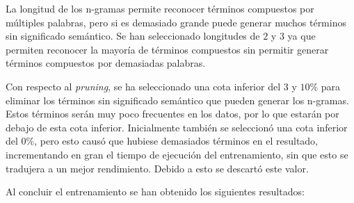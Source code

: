\documentclass[es]{uc3mreport}
\begin{document}
\begin{report}
    La longitud de los n-gramas permite reconocer términos compuestos por múltiples
    palabras, pero si es demasiado grande puede generar muchos términos sin significado
    semántico. Se han seleccionado longitudes de $2$ y $3$ ya que permiten reconocer
    la mayoría de términos compuestos sin permitir generar términos compuestos
    por demasiadas palabras.

    Con respecto al \textit{pruning}, se ha seleccionado una cota inferior del $3$ y $10$\%
    para eliminar los términos sin significado semántico que pueden generar los
    n-gramas. Estos términos serán muy poco frecuentes en los datos, por lo que
    estarán por debajo de esta cota inferior. Inicialmente también se seleccionó
    una cota inferior del $0\%$, pero esto causó que hubiese demasiados términos
    en el resultado, incrementando en gran el tiempo de ejecución del entrenamiento, sin que esto se tradujera a un mejor rendimiento.
    Debido a esto se descartó este valor.

    Al concluir el entrenamiento se han obtenido los siguientes resultados:


\end{report}
\end{document}
